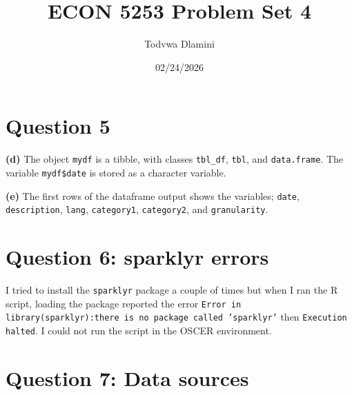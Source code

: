 \documentclass[11pt]{article}
\title{ECON 5253 Problem Set 4}
\author{Todvwa Dlamini}
\date{02/24/2026}
\begin{document}
\maketitle

\section*{Question 5}

\textbf{(d)} The object \texttt{mydf} is a tibble, with classes \texttt{tbl\_df}, \texttt{tbl}, and \texttt{data.frame}. The variable \texttt{mydf\$date} is stored as a character variable.

\textbf{(e)} The first rows of the dataframe output shows the variables; \texttt{date}, \texttt{description}, \texttt{lang}, \texttt{category1}, \texttt{category2}, and \texttt{granularity}.

\section*{Question 6: sparklyr errors}

I tried to install the \texttt{sparklyr} package a couple of times but when I ran the R script, loading the package reported the error \texttt{Error in library(sparklyr):there is no package called 'sparklyr'} then \texttt{Execution halted}. I could not run the script in the OSCER environment.


\section*{Question 7: Data sources}
\end{document}
